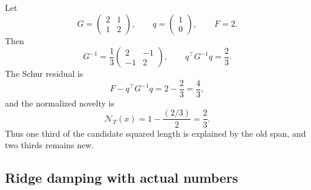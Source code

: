 \documentclass[10pt,twocolumn]{article}
\newcommand{\nov}{\mathcal N}
\begin{document}
Let
\begin{equation}
G=\begin{pmatrix}2&1\\1&2\end{pmatrix},
\qquad
q=\begin{pmatrix}1\\0\end{pmatrix},
\qquad
F=2.
\end{equation}
Then
\begin{equation}
G^{-1}=\frac13\begin{pmatrix}2&-1\\-1&2\end{pmatrix},
\qquad
q^\top G^{-1}q=\frac23.
\end{equation}
The Schur residual is
\begin{equation}
F-q^\top G^{-1}q=2-\frac23=\frac43,
\end{equation}
and the normalized novelty is
\begin{equation}
\nov_T(x)=1-\frac{(2/3)}{2}=\frac23.
\end{equation}
Thus one third of the candidate squared length is explained by the old span, and two thirds remains new.

\subsection{Ridge damping with actual numbers}
\end{document}
